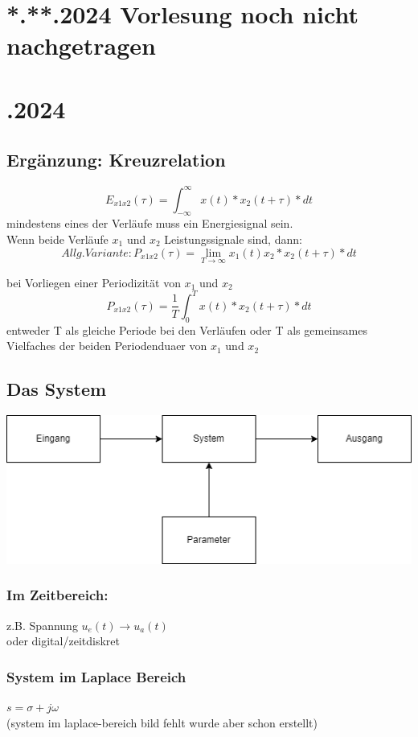 \documentclass{article}
\begin{document}
\section*{\centering **.**.2024 Vorlesung noch nicht nachgetragen}


\newpage
\section*{.2024}
\subsection*{Ergänzung: Kreuzrelation}

\[
    E_{x1x2}(\tau)=\int_{-\infty}^{\infty}x(t)*x_2(t+\tau)*dt
\]
mindestens eines der Verläufe muss ein Energiesignal sein. \\
Wenn beide Verläufe $x_1$ und $x_2$ Leistungssignale sind, dann:
\[
    Allg. Variante: P_{x1x2}(\tau)=\lim_{T\to\infty}x_1(t)x_2*x_2(t+\tau)*dt
\]

    bei Vorliegen einer Periodizität von $x_1$ und $x_2$
\[
    P_{x1x2}(\tau)=\frac{1}{T}\int_{0}^{T}x(t)*x_2(t+\tau)*dt
\]
entweder T als gleiche Periode bei den Verläufen oder T als gemeinsames Vielfaches der beiden Periodenduaer von $x_1$ und $x_2$

\subsection*{\centering Das System}
\includegraphics[scale=0.8]{img/2024_11_11.png}

\subsubsection*{Im Zeitbereich:}
z.B. Spannung $u_e(t) \to u_a(t)$ \\
oder digital/zeitdiskret

\subsubsection*{System im Laplace Bereich}
$s=\sigma+j\omega$ \\
(system im laplace-bereich bild fehlt wurde aber schon erstellt)
\end{document}
